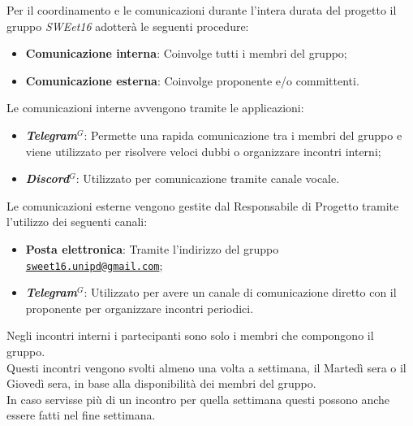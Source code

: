 
            Per il coordinamento e le comunicazioni durante l'intera durata del progetto il gruppo \textit{SWEet16} adotterà le seguenti procedure:

\begin{itemize}
\item \textbf{Comunicazione interna}: Coinvolge tutti i membri del gruppo;
\item \textbf{Comunicazione esterna}: Coinvolge proponente e/o committenti.
\end{itemize}


            Le comunicazioni interne avvengono tramite le applicazioni:

\begin{itemize}
\item \textbf{\emph{Telegram}$^{G}$}: Permette una rapida comunicazione tra i membri del gruppo e viene utilizzato per risolvere veloci dubbi o organizzare incontri interni;
\item \textbf{\emph{Discord}$^{G}$}: Utilizzato per comunicazione tramite canale vocale.
\end{itemize}


            Le comunicazioni esterne vengono gestite dal Responsabile di Progetto tramite l'utilizzo dei seguenti canali:

\begin{itemize}
\item \textbf{Posta elettronica}: Tramite l'indirizzo del gruppo \href{mailto:sweet16.unipd@gmail.com}{\nolinkurl{sweet16.unipd@gmail.com}};
\item \textbf{\emph{Telegram}$^{G}$}: Utilizzato per avere un canale di comunicazione diretto con il proponente per organizzare incontri periodici.
\end{itemize}



            Negli incontri interni i partecipanti sono solo i membri che compongono il gruppo. \\
            Questi incontri vengono svolti almeno una volta a settimana, il Martedì sera o il Giovedì sera, in base alla disponibilità dei membri del gruppo. \\
            In caso servisse più di un incontro per quella settimana questi possono anche essere fatti nel fine settimana.

